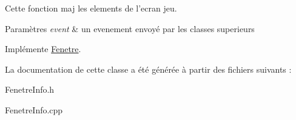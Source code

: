 \-Cette fonction maj les elements de l'ecran jeu. 


\begin{DoxyParams}{\-Paramètres}
{\em event} & un evenement envoyé par les classes superieurs \\
\hline
\end{DoxyParams}


\-Implémente \hyperlink{classFenetre}{\-Fenetre}.



\-La documentation de cette classe a été générée à partir des fichiers suivants \-:\begin{DoxyCompactItemize}
\item 
\-Fenetre\-Info.\-h\item 
\-Fenetre\-Info.\-cpp\end{DoxyCompactItemize}

